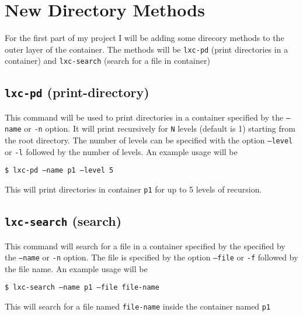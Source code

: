 \documentclass[12pt]{article}
\begin{document}
\section{New Directory Methods}

For the first part of my project I will be adding some direcory methods to the outer layer of the container. The methods will be \texttt{lxc-pd} (print directories in a container) and \texttt{lxc-search} (search for a file in container)

\subsection{\texttt{lxc-pd} (print-directory)}

This command will be used to print directories in a container specified by the \texttt{--name} or \texttt{-n} option. It will print recursively for \texttt{N} levels (default is 1) starting from the root directory. The number of levels can be specified with the option \texttt{--level} or \texttt{-l} followed by the number of levels. An example usage will be

\texttt{\$ lxc-pd --name p1 --level 5}

\noindent This will print directories in container \texttt{p1} for up to 5 levels of recursion.

\subsection{\texttt{lxc-search} (search)}

This command will search for a file in a container specified by the  specified by the \texttt{--name} or \texttt{-n} option. The file is specified by the option \texttt{--file} or \texttt{-f} followed by the file name. An example usage will be

\texttt{\$ lxc-search --name p1 --file file-name}

\noindent This will search for a file named \texttt{file-name} inside the container named \texttt{p1}
\end{document}

